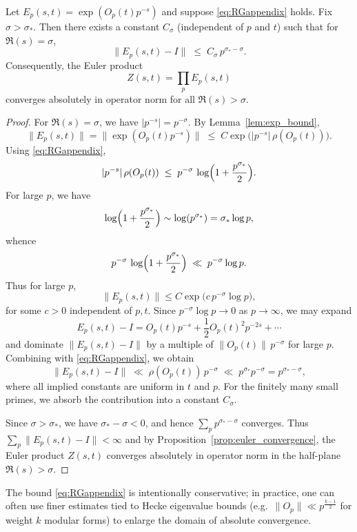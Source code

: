 \documentclass[11pt]{article}
\begin{document}
\begin{proposition}
\label{prop:local_factor_bound}
Let $E_p(s,t) = \exp(O_p(t) p^{-s})$ and suppose
\eqref{eq:RGappendix} holds. Fix $\sigma > \sigma_*$. Then there exists
a constant $C_\sigma$ (independent of $p$ and $t$) such that for
$\Re(s)=\sigma$,
\[
  \|E_p(s,t) - I\|
  \;\le\; C_\sigma\, p^{\sigma_*-\sigma}.
\]
Consequently, the Euler product
\[
  Z(s,t) = \prod_p E_p(s,t)
\]
converges absolutely in operator norm for all $\Re(s)>\sigma$.
\end{proposition}

\begin{proof}
For $\Re(s)=\sigma$, we have $|p^{-s}|=p^{-\sigma}$. By
Lemma~\ref{lem:exp_bound},
\[
  \|E_p(s,t)\| = \|\exp(O_p(t) p^{-s})\|
  \;\le\; C \exp\bigl(|p^{-s}|\,\rho(O_p(t))\bigr).
\]
Using \eqref{eq:RGappendix},
\[
  |p^{-s}|\,\rho(O_p(t))
  \;\le\; p^{-\sigma}\,\log\Bigl(1+\frac{p^{\sigma_*}}{2}\Bigr).
\]
For large $p$, we have
\[
  \log\Bigl(1+\frac{p^{\sigma_*}}{2}\Bigr)
  \sim \log(p^{\sigma_*}) = \sigma_* \log p,
\]
whence
\[
  p^{-\sigma}\,\log\Bigl(1+\frac{p^{\sigma_*}}{2}\Bigr)
  \;\ll\; p^{-\sigma} \log p.
\]
Thus for large $p$,
\[
  \|E_p(s,t)\|
  \le C \exp\bigl( c\, p^{-\sigma}\log p\bigr),
\]
for some $c>0$ independent of $p,t$. Since $p^{-\sigma}\log p \to 0$ as
$p\to\infty$, we may expand
\[
  E_p(s,t) - I
  = O_p(t) p^{-s} + \frac{1}{2}O_p(t)^2 p^{-2s} + \cdots
\]
and dominate $\|E_p(s,t) - I\|$ by a multiple of
$\|O_p(t)\|\,p^{-\sigma}$ for large $p$. Combining with
\eqref{eq:RGappendix}, we obtain
\[
  \|E_p(s,t) - I\|
  \;\ll\; \rho(O_p(t))\, p^{-\sigma}
  \;\ll\; p^{\sigma_*} p^{-\sigma}
  = p^{\sigma_* - \sigma},
\]
where all implied constants are uniform in $t$ and $p$. For the finitely
many small primes, we absorb the contribution into a constant
$C_\sigma$.

Since $\sigma > \sigma_*$, we have $\sigma_*-\sigma<0$, and hence
$\sum_p p^{\sigma_*-\sigma}$ converges. Thus
$\sum_p \|E_p(s,t)-I\| < \infty$ and by
Proposition~\ref{prop:euler_convergence}, the Euler product $Z(s,t)$
converges absolutely in operator norm in the half-plane $\Re(s)>\sigma$.
\end{proof}

\begin{remark}
The bound \eqref{eq:RGappendix} is intentionally conservative; in
practice, one can often use finer estimates tied to Hecke eigenvalue
bounds (e.g.\ $\|O_p\|\ll p^{\frac{k-1}{2}}$ for weight $k$ modular
forms) to enlarge the domain of absolute convergence.
\end{remark}
\end{document}

